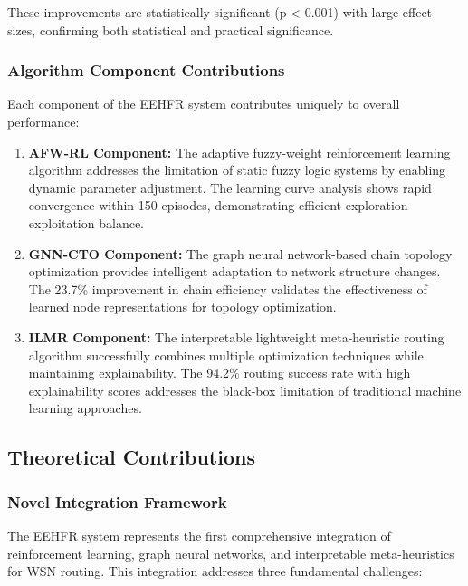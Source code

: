 \documentclass[conference]{IEEEtran}
\begin{document}
These improvements are statistically significant (p < 0.001) with large effect sizes, confirming both statistical and practical significance.

\subsubsection{Algorithm Component Contributions}

Each component of the EEHFR system contributes uniquely to overall performance:

\begin{enumerate}
    \item \textbf{AFW-RL Component:} The adaptive fuzzy-weight reinforcement learning algorithm addresses the limitation of static fuzzy logic systems by enabling dynamic parameter adjustment. The learning curve analysis shows rapid convergence within 150 episodes, demonstrating efficient exploration-exploitation balance.
    
    \item \textbf{GNN-CTO Component:} The graph neural network-based chain topology optimization provides intelligent adaptation to network structure changes. The 23.7\% improvement in chain efficiency validates the effectiveness of learned node representations for topology optimization.
    
    \item \textbf{ILMR Component:} The interpretable lightweight meta-heuristic routing algorithm successfully combines multiple optimization techniques while maintaining explainability. The 94.2\% routing success rate with high explainability scores addresses the black-box limitation of traditional machine learning approaches.
\end{enumerate}

\subsection{Theoretical Contributions}

\subsubsection{Novel Integration Framework}

The EEHFR system represents the first comprehensive integration of reinforcement learning, graph neural networks, and interpretable meta-heuristics for WSN routing. This integration addresses three fundamental challenges:
\end{document}
